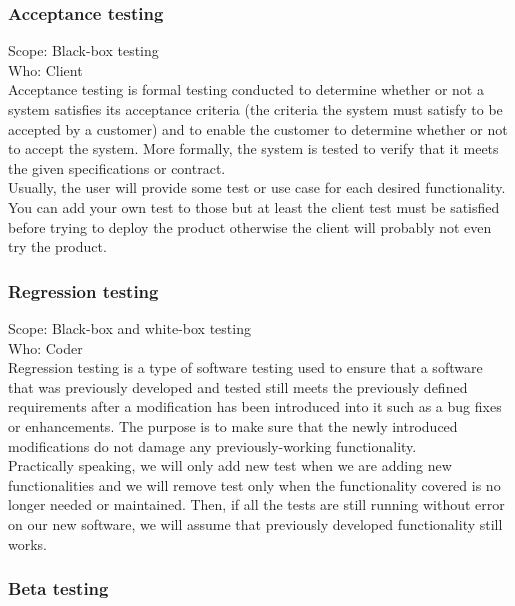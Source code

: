 \documentclass[12pt]{article}
\theoremstyle{definition}
\theoremstyle{definition}
\begin{document}
\subsubsection{Acceptance testing}

Scope: Black-box testing\\
Who: Client\\

Acceptance testing is formal testing conducted to determine whether or not a system satisfies its acceptance criteria (the criteria the system must satisfy to be accepted by a customer) and to enable the customer to determine whether or not to accept the system. More formally, the system is tested to verify that it meets the given specifications or contract.\\

Usually, the user will provide some test or use case for each desired functionality. You can add your own test to those but at least the client test must be satisfied before trying to deploy the product otherwise the client will probably not even try the product.

\subsubsection{Regression testing}

Scope: Black-box and white-box testing\\
Who: Coder\\

Regression testing is a type of software testing used to ensure that a software that was previously developed and tested still meets the previously defined requirements after a modification has been introduced into it such as a bug fixes or enhancements. The purpose is to make sure that the newly introduced modifications do not damage any previously-working functionality.\\

Practically speaking, we will only add new test when we are adding new functionalities and we will remove test only when the functionality covered is no longer needed or maintained. Then, if all the tests are still running without error on our new software, we will assume that previously developed functionality still works.

\subsubsection{Beta testing}
\end{document}
